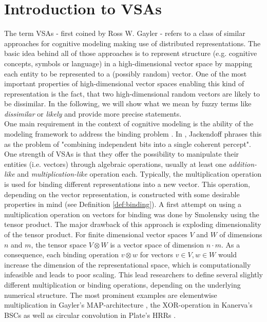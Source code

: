 \chapter{Introduction to \aclp{VSA}}
The term \acfp{VSA} - first coined by Ross W. Gayler \cite{Gayler2003} - refers to a class of similar approaches for cognitive modeling making use of distributed representations.
The basic idea behind all of those approaches is to represent structure (e.g. cognitive concepts, symbols or language) in a high-dimensional vector space by mapping each entity to be represented to a (possibly random) vector.
One of the most important properties of high-dimensional vector spaces enabling this kind of representation is the fact, that two high-dimensional random vectors are likely to be dissimilar.
In the following, we will show what we mean by fuzzy terms like \emph{dissimilar} or \emph{likely} and provide more precise statements.\\
One main requirement in the context of cognitive modeling is the ability of the modeling framework to address the binding problem \cite{Treisman1999}.
In \cite{Jackendoff2002}, Jackendoff phrases this as the problem of "combining independent bits into a single coherent percept".
One strength of \acp{VSA} is that they offer the possibility to manipulate their entities (i.e. vectors) through algebraic operations, usually at least one \emph{addition-like} and \emph{multiplication-like} operation each.
Typically, the multiplication operation is used for binding different representations into a new vector.
This operation, depending on the vector representation, is constructed with some desirable properties in mind (see Definition \ref{def:binding}).
A first attempt on using a multiplication operation on vectors for binding was done by Smolensky \cite{Smolensky1990} using the tensor product.
The major drawback of this approach is exploding dimensionality of the tensor product.
For finite dimensional vector spaces  $V$ and $W$ of dimensions $n$ and $m$, the tensor space $V \otimes W$ is a vector space of dimension $n\cdot m$.
As a consequence, each binding operation $v\otimes w$ for vectors $v \in V, w \in W$ would increase the dimension of the representational space, which is computationally infeasible and leads to poor scaling.
This lead researchers to define several slightly different multiplication or binding operations, depending on the underlying numerical structure.
The most prominent examples are elementwise multiplication in Gayler's \ac{MAP}-architecture \cite{Gayler1998}, the XOR-operation in Kanerva's \acp{BSC} \cite{Kanerva2000, Kanerva2009} as well as circular convolution in Plate's \acp{HRR} \cite{Plate1991, Plate1994}.


